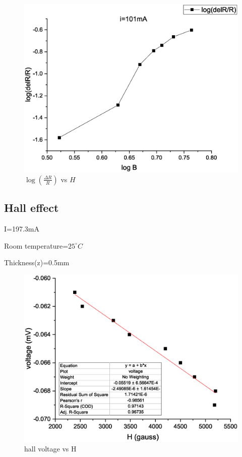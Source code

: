             \begin{figure}[]
                \centering
                \includegraphics[width=0.95\columnwidth]{images/Graph4.eps}
                \caption{$\log(\frac{\Delta R}{R})$ vs $H$}
                \label{fig:graph4}
            \end{figure}

    \subsection{Hall effect}
        I=197.3mA

        Room temperature=$25^{\circ}C$ 
        
        Thickness(z)=0.5mm
        
        

        \begin{figure}[h!]
        \centering
        \includegraphics[width=0.95\columnwidth]{images/Graph6.eps}%
        \caption{\label{fig:epsart} hall voltage vs H}
        \end{figure}

